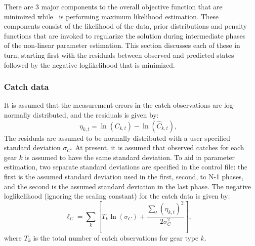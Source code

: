 There are 3 major components to the overall objective function that are minimized while \iscam\ is performing maximum likelihood estimation.  These components consist of the likelihood of the data, prior distributions and penalty functions that are invoked to regularize the solution during intermediate phases of the non-linear parameter estimation.  This section discusses each of these in turn, starting first with the residuals between observed and predicted states followed by the negative loglikelihood that is minimized.

\subsubsection{Catch data}
It is assumed that the measurement errors in the catch observations are log-normally distributed, and the residuals is given by:
\begin{equation}\label{eq2}
\eta_{k,t}=\ln(C_{k,t}) -  \ln(\hat{C}_{k,t}),
\end{equation}
The residuals are assumed to be normally distributed with a user specified standard deviation $\sigma_{C}$.  At present, it is assumed that observed catches for each gear $k$ is assumed to have the same standard deviation.  To aid in parameter estimation, two separate standard deviations are specified in the control file: the first is the assumed standard deviation used in the first, second, to N-1 phases, and the second is the assumed standard deviation in the last phase.  The negative loglikelihood (ignoring the scaling constant) for the catch data is given by:
\begin{equation}\label{eq3}
\ell_C = \sum_k\left[  T_k\ln(\sigma_C)+\frac{\sum_t(\eta_{k,t})^2}{2\sigma_C^2}\right],
\end{equation}
where $T_k$ is the total number of catch observations for gear type $k$.



